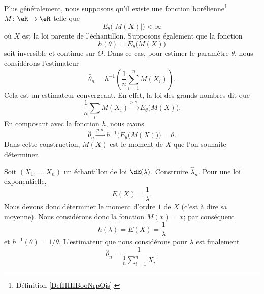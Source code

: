 Plus généralement, nous supposons qu'il existe une fonction borélienne\footnote{Définition \ref{DefHHIBooNrpQjs}.} \( M\colon \eR\to \eR\) telle que
\begin{equation}
    E_{\theta}\big( | M(X) | \big)<\infty
\end{equation}
où \( X\) est la loi parente de l'échantillon. Supposons également que la fonction 
\begin{equation}
    h(\theta)=E_{\theta}\big( M(X) \big)
\end{equation}
soit inversible et continue sur \( \Theta\). Dans ce cas, pour estimer le paramètre \( \theta\), nous considérons l'estimateur
\begin{equation}
    \hat\theta_n=h^{-1}\left( \frac{1}{ n }\sum_{i=1}^nM(X_i) \right).
\end{equation}
Cela est un estimateur convergeant. En effet, la loi des grands nombres dit que
\begin{equation}
    \frac{1}{ n }\sum_iM(X_i)\stackrel{p.s.}{\longrightarrow}E_{\theta}\big( M(X) \big).
\end{equation}
En composant avec la fonction \( h\), nous avons
\begin{equation}
    \hat\theta_n\stackrel{p.s.}{\longrightarrow}h^{-1}\Big( E_{\theta}\big( M(X) \big) \Big)=\theta.
\end{equation}
Dans cette construction, \( M(X)\) est le moment de \( X\) que l'on souhaite déterminer.

\begin{example}
    Soit \( (X_1,\ldots,X_n)\) un échantillon de loi \( \dE(\lambda)\). Construire \( \hat\lambda_n\). Pour une loi exponentielle,
    \begin{equation}
        E(X)=\frac{1}{ \lambda }.
    \end{equation}
    Nous devons donc déterminer le moment d'ordre \( 1\) de \( X\) (c'est à dire sa moyenne). Nous considérons donc la fonction \( M(x)=x\); par conséquent
    \begin{equation}
        h(\lambda)=E(X)=\frac{1}{ \lambda }
    \end{equation}
    et \( h^{-1}(\theta)=1/\theta\). L'estimateur que nous considérons pour \( \lambda\) est finalement
    \begin{equation}
        \hat\theta_n=\frac{1}{ \frac{1}{ n }\sum_{i=1}^nX_i }.
    \end{equation}
\end{example}

